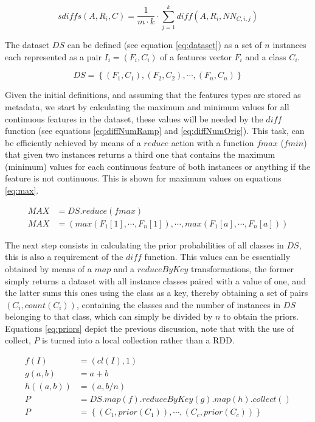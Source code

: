 \begin{equation}
\label{eq:sumOfDiffs}
sdiffs(A,R_i,C) = \frac{1}{m \cdot k} \cdot \sum_{j = 1}^{k} diff(A,R_i,NN_{C,i,j})
\end{equation}

The dataset $DS$ can be defined (see equation \ref{eq:dataset}) as a set of $n$ instances each represented as a pair $I_i = (F_i,C_i)$ of a features vector $F_i$ and a class $C_i$. 

\begin{equation}
\label{eq:dataset}
DS = \left \{ (F_1,C_1),(F_2,C_2),\cdots,(F_n,C_n) \right \}
\end{equation}
  
Given the initial definitions, and assuming that the features types are stored as metadata, we start by calculating the maximum and minimum values for all continuous features in the dataset, these values will be needed by the $diff$ function (see equations \ref{eq:diffNumRamp} and \ref{eq:diffNumOrig}). This task, can be efficiently achieved by means of a $reduce$ action with a function $fmax$ ($fmin$) that given two instances returns a third one that contains the maximum (minimum) values for each continuous feature of both instances or anything if the feature is not continuous. This is shown for maximum values on equations \ref{eq:max}.

\begin{align}
\label{eq:max}
MAX & = DS.reduce(fmax) \nonumber \\
MAX & = (max(F_1[1],\cdots,F_n[1]), \cdots , max(F_1[a],\cdots,F_n[a]))
\end{align}

The next step consists in calculating the prior probabilities of all classes in $DS$, this is also a requirement of the $diff$ function. This values can be essentially obtained by means of a $map$ and a $reduceByKey$ transformations, the former simply returns a dataset with all instance classes paired with a value of one, and the latter sums this ones using the class as a key, thereby obtaining a set of pairs $(C_i, count(C_i))$, containing the classes and the number of instances in $DS$ belonging to that class, which can simply be divided by $n$ to obtain the priors. Equations \ref{eq:priors} depict the previous discussion, note that with the use of collect, $P$ is turned into a local collection rather than a RDD.

\begin{align}
\label{eq:priors}
f(I) & = (cl(I),1) \nonumber \\
g(a,b) & = a + b \nonumber \\
h((a,b)) & = (a, b / n) \nonumber \\
P & = DS.map(f).reduceByKey(g).map(h).collect() \nonumber \\
P & = \left \{ (C_1, prior(C_1)), \cdots , (C_c, prior(C_c)) \right \}
\end{align}

